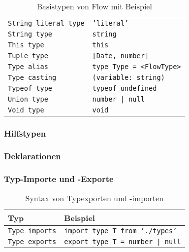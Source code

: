 \begin{table}
\begin{tabular}{@{}ll@{}}
    \texttt{String literal type}        & \texttt{'literal'}                                       \\
    \texttt{String type}                & \texttt{string}                                          \\
    \texttt{This type}                  & \texttt{this}                                            \\
    \texttt{Tuple type}                 & \texttt{{[}Date, number{]}}                              \\
    \texttt{Type alias}                 & \texttt{type Type = <{}FlowType>{}}                      \\
    \texttt{Type casting}               & \texttt{(variable: string)}                              \\
    \texttt{Typeof type}                & \texttt{typeof undefined}                                \\
    \texttt{Union type}                 & \texttt{number | null}                                   \\
    \texttt{Void type}                  & \texttt{void}                                            \\
    \bottomrule
  \end{tabular}
  \caption{Basistypen von Flow mit Beispiel}
  \label{tab:flow-base-types}
\end{table}

\subsubsection{Hilfstypen}


\subsubsection{Deklarationen}

\subsubsection{Typ-Importe und -Exporte}

\begin{table}
  \begin{tabular}{@{}ll@{}}
    \toprule
    \textbf{Typ}               & \textbf{Beispiel}                      \\
    \midrule
    \texttt{Type imports}     & \texttt{import type T from './types'}   \\
    \texttt{Type exports}     & \texttt{export type T = number | null}  \\
  \end{tabular}
  \caption{Syntax von Typexporten und -importen}
  \label{tab:flow-base-types}
\end{table}


